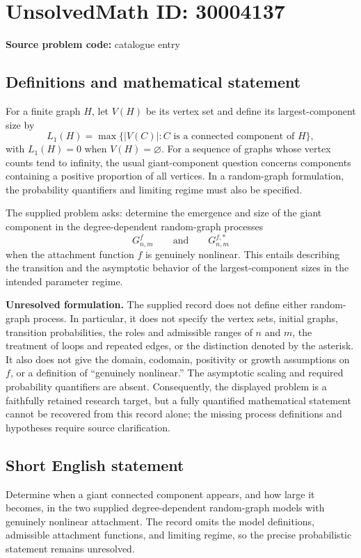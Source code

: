 \documentclass[11pt]{article}
\begin{document}
\section*{UnsolvedMath ID: 30004137}
\textbf{Source problem code:} catalogue entry
\subsection{Definitions and mathematical statement}
For a finite graph \(H\), let \(V(H)\) be its vertex set and define its largest-component size by
\[
L_1(H)=\max\{\lvert V(C)\rvert:C\text{ is a connected component of }H\},
\]
with \(L_1(H)=0\) when \(V(H)=\varnothing\). For a sequence of graphs whose vertex counts tend to infinity, the usual giant-component question concerns components containing a positive proportion of all vertices. In a random-graph formulation, the probability quantifiers and limiting regime must also be specified.

The supplied problem asks: determine the emergence and size of the giant component in the degree-dependent random-graph processes
\[
G^f_{n,m}\qquad\text{and}\qquad G^{f,*}_{n,m}
\]
when the attachment function \(f\) is genuinely nonlinear. This entails describing the transition and the asymptotic behavior of the largest-component sizes in the intended parameter regime.

\textbf{Unresolved formulation.} The supplied record does not define either random-graph process. In particular, it does not specify the vertex sets, initial graphs, transition probabilities, the roles and admissible ranges of \(n\) and \(m\), the treatment of loops and repeated edges, or the distinction denoted by the asterisk. It also does not give the domain, codomain, positivity or growth assumptions on \(f\), or a definition of ``genuinely nonlinear.'' The asymptotic scaling and required probability quantifiers are absent. Consequently, the displayed problem is a faithfully retained research target, but a fully quantified mathematical statement cannot be recovered from this record alone; the missing process definitions and hypotheses require source clarification.
\subsection{Short English statement}
Determine when a giant connected component appears, and how large it becomes, in the two supplied degree-dependent random-graph models with genuinely nonlinear attachment. The record omits the model definitions, admissible attachment functions, and limiting regime, so the precise probabilistic statement remains unresolved.
\end{document}
